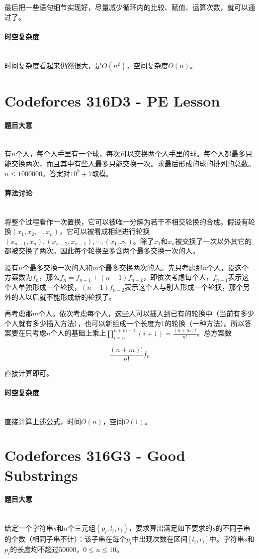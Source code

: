 \documentclass[UTF8]{ctexart}
\newcommand{\myparagraph}[1]{\paragraph{#1}\mbox{}\\}
\theoremstyle{nonumberplain}
\begin{document}
			最后把一些语句细节实现好，尽量减少循环内的比较、赋值、运算次数，就可以通过了。
		
		\myparagraph{时空复杂度}
		
			时间复杂度看起来仍然很大，是$O(n^2)$，空间复杂度$O(n)$。
	
	\section{Codeforces 316D3 - PE Lesson}
	
		\myparagraph{题目大意}
		
			有$n$个人，每个人手里有一个球，每次可以交换两个人手里的球。每个人都最多只能交换两次，而且其中有些人最多只能交换一次。求最后形成的球的排列的总数。$n \leq 1000000$。答案对$10^9+7$取模。
		
		\myparagraph{算法讨论}
		
			将整个过程看作一次置换，它可以被唯一分解为若干不相交轮换的合成。假设有轮换$(x_1,x_2,\cdots,x_n)$，它可以被看成相继进行轮换$(x_{n-1},x_n),(x_{n-2},x_{n-1}),\cdots,(x_1,x_2)$。除了$x_1$和$x_n$被交换了一次以外其它的都被交换了两次。因此每个轮换至多含两个最多交换一次的人。
			
			设有$n$个最多交换一次的人和$m$个最多交换两次的人。先只考虑那$n$个人，设这个方案数为$f_n$，那么$f_n=f_{n-1}+(n-1)f_{n-2}$，即依次考虑每个人，$f_{n-1}$表示这个人单独形成一个轮换，$(n-1)f_{n-2}$表示这个人与别人形成一个轮换，那个另外的人以后就不能形成新的轮换了。
			
			再考虑那$m$个人。依次考虑每个人，这些人可以插入到已有的轮换中（当前有多少个人就有多少插入方法），也可以新组成一个长度为1的轮换（一种方法）。所以答案要在只考虑$n$个人的基础上乘上$\prod_{i=n}^{n+m-1}(i+1)=\frac{(n+m)!}{n!}$。总方案数
			
			$$\frac{(n+m)!}{n!}f_n$$
			
			直接计算即可。
		
		\myparagraph{时空复杂度}
		
			直接计算上述公式，时间$O(n)$，空间$O(1)$。
	
	\section{Codeforces 316G3 - Good Substrings}
		
		\myparagraph{题目大意}
		
			给定一个字符串$s$和$n$个三元组$(p_i,l_i,r_i)$，要求算出满足如下要求的$s$的不同子串的个数（相同子串不计）：该子串在每个$p_i$中出现次数在区间$[l_i,r_i]$中。字符串$s$和$p_i$的长度均不超过50000，$0 \leq n \leq 10$。
		
\end{document}
